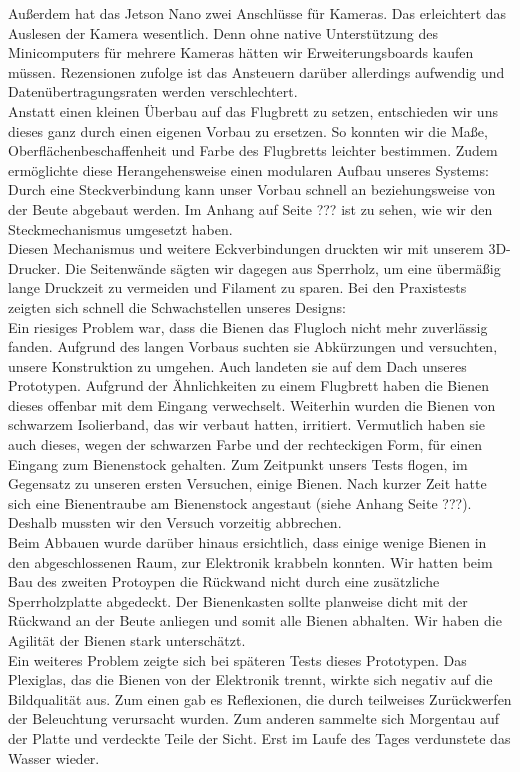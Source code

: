 \documentclass[11pt,a4paper]{article}
\begin{document}
Außerdem hat das Jetson Nano zwei Anschlüsse für Kameras. Das erleichtert das Auslesen der Kamera wesentlich. Denn ohne native Unterstützung des Minicomputers für mehrere Kameras hätten wir Erweiterungsboards kaufen müssen. Rezensionen zufolge ist das Ansteuern darüber allerdings aufwendig und Datenübertragungsraten werden verschlechtert.\\
Anstatt einen kleinen Überbau auf das Flugbrett zu setzen, entschieden wir uns dieses ganz durch einen eigenen Vorbau zu ersetzen. So konnten wir die Maße, Oberflächenbeschaffenheit und Farbe des Flugbretts leichter bestimmen. Zudem ermöglichte diese Herangehensweise einen modularen Aufbau unseres Systems: Durch eine Steckverbindung kann unser Vorbau schnell an beziehungsweise von der Beute abgebaut werden. Im Anhang auf Seite ??? ist zu sehen, wie wir den Steckmechanismus umgesetzt haben.\\
Diesen Mechanismus und weitere Eckverbindungen druckten wir mit unserem 3D-Drucker. Die Seitenwände sägten wir dagegen aus Sperrholz, um eine übermäßig lange Druckzeit zu vermeiden und Filament zu sparen.
Bei den Praxistests zeigten sich schnell die Schwachstellen unseres Designs:\\
Ein riesiges Problem war, dass die Bienen das Flugloch nicht mehr zuverlässig fanden. Aufgrund des langen Vorbaus suchten sie Abkürzungen und versuchten, unsere Konstruktion zu umgehen. Auch landeten sie auf dem Dach unseres Prototypen. Aufgrund der Ähnlichkeiten zu einem Flugbrett haben die Bienen dieses offenbar mit dem Eingang verwechselt. Weiterhin wurden die Bienen von schwarzem Isolierband, das wir verbaut hatten, irritiert. Vermutlich haben sie auch dieses, wegen der schwarzen Farbe und der rechteckigen Form, für einen Eingang zum Bienenstock gehalten. Zum Zeitpunkt unsers Tests flogen, im Gegensatz zu unseren ersten Versuchen, einige Bienen. Nach kurzer Zeit hatte sich eine Bienentraube am Bienenstock angestaut (siehe Anhang Seite ???). Deshalb mussten wir den Versuch vorzeitig abbrechen.\\
Beim Abbauen wurde darüber hinaus ersichtlich, dass einige wenige Bienen in den abgeschlossenen Raum, zur Elektronik krabbeln konnten. Wir hatten beim Bau des zweiten Protoypen die Rückwand nicht durch eine zusätzliche Sperrholzplatte abgedeckt. Der Bienenkasten sollte planweise dicht mit der Rückwand an der Beute anliegen und somit alle Bienen abhalten. Wir haben die Agilität der Bienen stark unterschätzt.\\
Ein weiteres Problem zeigte sich bei späteren Tests dieses Prototypen. Das Plexiglas, das die Bienen von der Elektronik trennt, wirkte sich negativ auf die Bildqualität aus. Zum einen gab es Reflexionen, die durch teilweises Zurückwerfen der Beleuchtung verursacht wurden. Zum anderen sammelte sich Morgentau auf der Platte und verdeckte Teile der Sicht. Erst im Laufe des Tages verdunstete das Wasser wieder.
\end{document}
